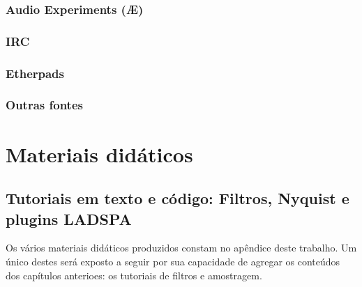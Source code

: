 \subsubsection{Audio Experiments (Æ)}

\subsubsection{IRC}

\subsubsection{Etherpads}

\subsubsection{Outras fontes}

\section{Materiais didáticos}

  \subsection{Tutoriais em texto e código: Filtros, Nyquist e plugins LADSPA}

Os vários materiais didáticos produzidos constam no apêndice
deste trabalho. Um único destes será exposto a seguir por sua
capacidade de agregar os conteúdos dos capítulos anterioes:
os tutoriais de filtros e amostragem.

